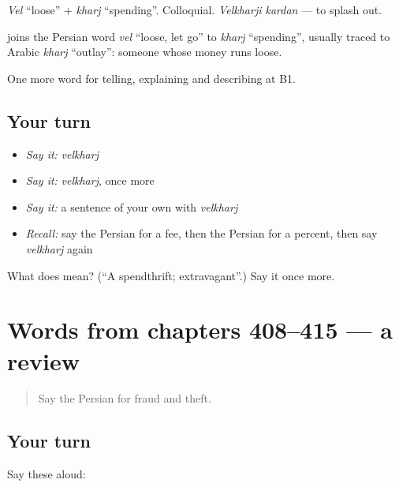 \emph{Vel} \textquotedblleft{}loose\textquotedblright{} + \emph{kharj} \textquotedblleft{}spending\textquotedblright{}. Colloquial. \emph{Velkharji kardan} — to splash out.

\begin{cousinweb}
\textbf{} joins the Persian word \emph{vel} \textquotedblleft{}loose, let go\textquotedblright{} to \emph{kharj} \textquotedblleft{}spending\textquotedblright{}, usually traced to Arabic \emph{kharj} \textquotedblleft{}outlay\textquotedblright{}: someone whose money runs loose.
\end{cousinweb}

\begin{grammarlens}[title={What you've built}]
One more word for telling, explaining and describing at B1.
\end{grammarlens}

\subsection*{Your turn}
\begin{itemize}
\raggedright
  \item \emph{Say it:} \emph{velkharj}
  \item \emph{Say it:} \emph{velkharj}, once more
  \item \emph{Say it:} a sentence of your own with \emph{velkharj}
  \item \emph{Recall:} say the Persian for a fee, then the Persian for a percent, then say \emph{velkharj} again
\end{itemize}

\begin{tcolorbox}[breakable,colback=teal!4,colframe=teal!35!black,title={Before you move on}]
What does  mean? (\textquotedblleft{}A spendthrift; extravagant\textquotedblright{}.) Say it once more.
\end{tcolorbox}
\section[(dialogue)]{Words from chapters 408–415 — a review}

\label{lesson:FA-R415-review-408-415}



\begin{quote}
Say the Persian for fraud and theft.
\end{quote}

\subsection*{Your turn}
Say these aloud:

